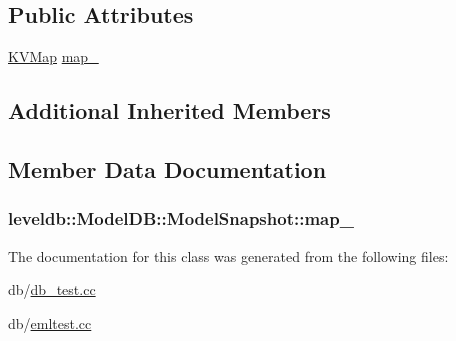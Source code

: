 \subsection*{Public Attributes}
\begin{DoxyCompactItemize}
\item 
\hyperlink{namespaceleveldb_aac1e50450147be263e08252c6700f7a7}{K\+V\+Map} \hyperlink{classleveldb_1_1_model_d_b_1_1_model_snapshot_a7ae02397c293072b78874d0c073a10c5}{map\+\_\+}
\end{DoxyCompactItemize}
\subsection*{Additional Inherited Members}


\subsection{Member Data Documentation}
\hypertarget{classleveldb_1_1_model_d_b_1_1_model_snapshot_a7ae02397c293072b78874d0c073a10c5}{}
\subsubsection[{map\+\_\+}]{ leveldb\+::\+Model\+D\+B\+::\+Model\+Snapshot\+::map\+\_\+}\label{classleveldb_1_1_model_d_b_1_1_model_snapshot_a7ae02397c293072b78874d0c073a10c5}


The documentation for this class was generated from the following files\+:\begin{DoxyCompactItemize}
\item 
db/\hyperlink{db__test_8cc}{db\+\_\+test.\+cc}\item 
db/\hyperlink{emltest_8cc}{emltest.\+cc}\end{DoxyCompactItemize}

